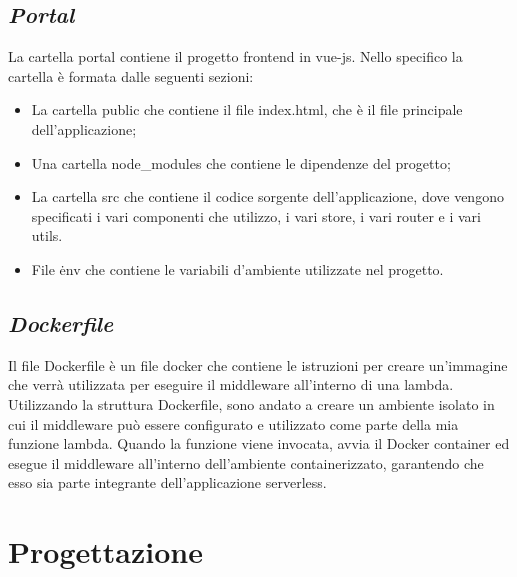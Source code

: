\subsection*{\emph{Portal}}
La cartella portal contiene il progetto frontend in vue-js. Nello specifico la cartella è formata dalle seguenti sezioni:
\begin{itemize}
  \item La cartella public che contiene il file index.html, che è il file principale dell'applicazione;
  \item Una cartella node\_modules che contiene le dipendenze del progetto;
  \item La cartella src che contiene il codice sorgente dell'applicazione, dove vengono specificati i vari componenti che utilizzo, i vari store, i vari router e i vari utils.
  \item File \.env che contiene le variabili d'ambiente utilizzate nel progetto.
\end{itemize}

\subsection*{\emph{Dockerfile}}
Il file Dockerfile è un file docker che contiene le istruzioni per creare un'immagine che verrà utilizzata per eseguire il middleware all'interno di una lambda.\\
Utilizzando la struttura Dockerfile, sono andato a creare un ambiente isolato in cui il middleware può essere configurato e utilizzato come parte della mia funzione 
lambda. Quando la funzione viene invocata, avvia il Docker container ed esegue il middleware all'interno dell'ambiente containerizzato, 
garantendo che esso sia parte integrante dell'applicazione serverless.


\section{Progettazione}\label{sec:progettazione}

